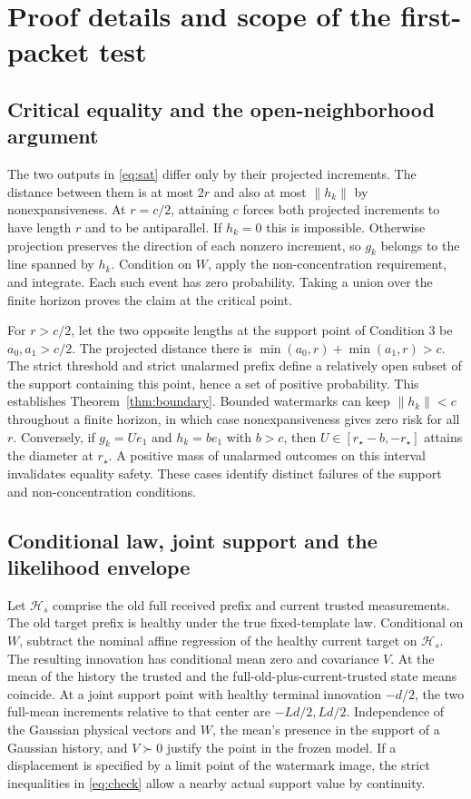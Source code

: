 \section{Proof details and scope of the first-packet test}
\label{app:proof}

\subsection{Critical equality and the open-neighborhood argument}

The two outputs in \eqref{eq:sat} differ only by their projected increments. The distance between them is at most \(2r\) and also at most \(\|h_k\|\) by nonexpansiveness. At \(r=c/2\), attaining \(c\) forces both projected increments to have length \(r\) and to be antiparallel. If \(h_k=0\) this is impossible. Otherwise projection preserves the direction of each nonzero increment, so \(g_k\) belongs to the line spanned by \(h_k\). Condition on \(W\), apply the non-concentration requirement, and integrate. Each such event has zero probability. Taking a union over the finite horizon proves the claim at the critical point.

For \(r>c/2\), let the two opposite lengths at the support point of Condition 3 be \(a_0,a_1>c/2\). The projected distance there is \(\min(a_0,r)+\min(a_1,r)>c\). The strict threshold and strict unalarmed prefix define a relatively open subset of the support containing this point, hence a set of positive probability. This establishes Theorem~\ref{thm:boundary}. Bounded watermarks can keep \(\|h_k\|<c\) throughout a finite horizon, in which case nonexpansiveness gives zero risk for all \(r\). Conversely, if \(g_k=Ue_1\) and \(h_k=be_1\) with \(b>c\), then \(U\in[r_\star-b,-r_\star]\) attains the diameter at \(r_\star\). A positive mass of unalarmed outcomes on this interval invalidates equality safety. These cases identify distinct failures of the support and non-concentration conditions.

\subsection{Conditional law, joint support and the likelihood envelope}

Let \(\mathcal H_s\) comprise the old full received prefix and current trusted measurements. The old target prefix is healthy under the true fixed-template law. Conditional on \(W\), subtract the nominal affine regression of the healthy current target on \(\mathcal H_s\). The resulting innovation has conditional mean zero and covariance \(V\). At the mean of the history the trusted and the full-old-plus-current-trusted state means coincide. At a joint support point with healthy terminal innovation \(-d/2\), the two full-mean increments relative to that center are \(-Ld/2,Ld/2\). Independence of the Gaussian physical vectors and \(W\), the mean's presence in the support of a Gaussian history, and \(V\succ0\) justify the point in the frozen model. If a displacement is specified by a limit point of the watermark image, the strict inequalities in \eqref{eq:check} allow a nearby actual support value by continuity.

